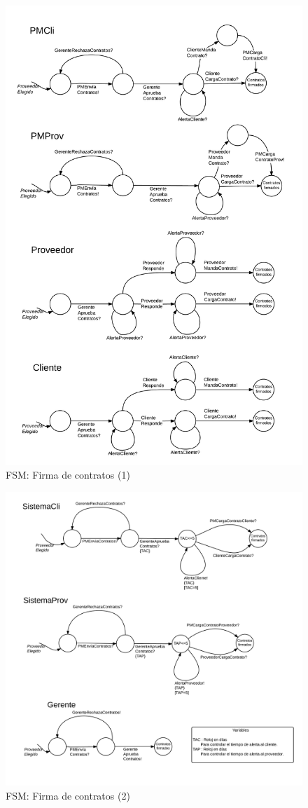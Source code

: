 \begin{figure}[H]
\centering
\includegraphics[width=0.8\linewidth]{diag/nuevos/fsm-firmcont1.png}
\caption{FSM: Firma de contratos (1)}
\label{fsm-firmcont1}
\end{figure}

\begin{figure}[H]
\centering
\includegraphics[width=0.8\linewidth]{diag/nuevos/fsm-firmcont2.png}
\caption{FSM: Firma de contratos (2)}
\label{fsm-firmcont2}
\end{figure}

